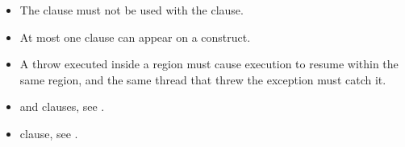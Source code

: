 \begin{itemize}
\item The  clause must not be used with the  clause.

\item At most one  clause can appear on a  construct.

\cppspecificstart
\item A throw executed inside a  region must cause execution to resume within the 
same  region, and the same thread that threw the exception must catch it.
\cppspecificend
\end{itemize}


\crossreferences
\begin{itemize}
\item {} and  clauses, see 
.

\item {} clause, see 
.
\end{itemize}



